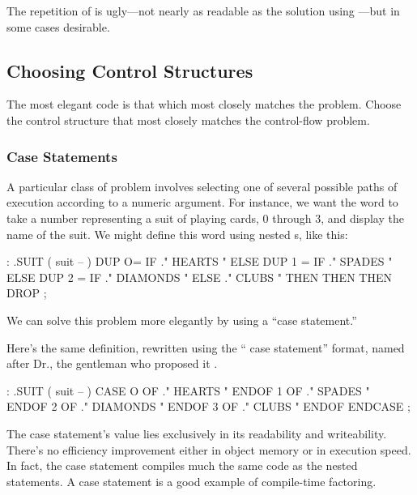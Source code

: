 The repetition of  is ugly---not nearly as readable as the
solution using ---but in some cases desirable.%
%
%

\subsection{Choosing Control Structures}%
\begin{tip}
The most elegant code is that which most closely matches the problem.
Choose the control structure that most closely matches the control-flow
problem.
\end{tip}%

\subsubsection{Case Statements}%
%

A particular class of problem involves selecting one of several possible
paths of execution according to a numeric argument. For instance, we
want the word  to take a number representing a suit of playing
cards, 0 through 3, and display the name of the suit. We might define this
word using nested s, like this:

\begin{Code}
: .SUIT ( suit -- )
  DUP  O=  IF ." HEARTS "   ELSE
  DUP  1 = IF ." SPADES "   ELSE
  DUP  2 = IF ." DIAMONDS " ELSE
              ." CLUBS "
  THEN THEN THEN  DROP ;
\end{Code}
We can solve this problem more elegantly by using a ``case statement.''

Here's the same definition, rewritten using the `` case
statement'' format, named after Dr.\@ {}, the
gentleman who proposed it \cite{eaker}.

\begin{Code}
: .SUIT ( suit -- )
  CASE
  O OF   ." HEARTS "    ENDOF
  1 OF   ." SPADES "    ENDOF
  2 OF   ." DIAMONDS "  ENDOF
  3 OF   ." CLUBS "     ENDOF     ENDCASE ;
\end{Code}
The case statement's value lies exclusively in its readability and
writeability. There's no efficiency improvement either in object memory or
in execution speed. In fact, the case statement compiles much the same
code as the nested  statements. A case statement
is a good example of compile-time factoring.

